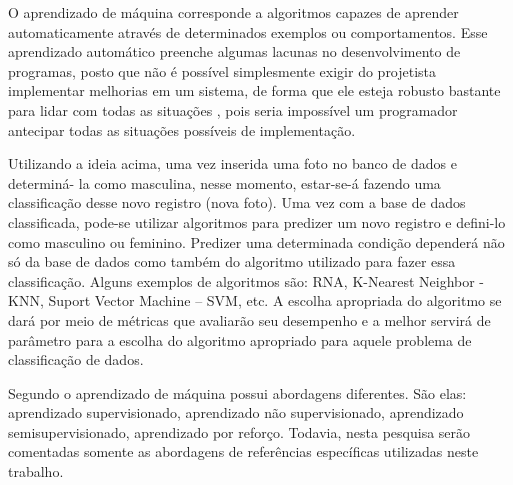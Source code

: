O aprendizado de máquina corresponde a algoritmos capazes de aprender automaticamente através de determinados exemplos ou comportamentos. Esse aprendizado automático preenche algumas lacunas no desenvolvimento de programas, posto que não é possível simplesmente exigir do projetista implementar melhorias em um sistema, de forma que ele esteja robusto bastante para lidar com todas as situações \cite{RusselStuart.Norvig2013}, pois seria impossível um programador antecipar todas as situações possíveis de implementação.



Utilizando a ideia acima, uma vez inserida uma foto no banco de dados e determiná- la como masculina, nesse momento, estar-se-á fazendo uma classificação desse novo registro (nova foto). Uma vez com a base de dados classificada, pode-se utilizar algoritmos para predizer um novo registro e defini-lo como masculino ou feminino. Predizer uma determinada condição dependerá não só da base de dados como também do algoritmo utilizado para fazer essa classificação. Alguns exemplos de algoritmos são: RNA, K-Nearest Neighbor - KNN, Suport Vector Machine – SVM, etc. A escolha apropriada do algoritmo se dará por meio de métricas que avaliarão seu desempenho e a melhor servirá de parâmetro para a escolha do algoritmo apropriado para aquele problema de classificação de dados. 


Segundo \cite{Mohri2012} o aprendizado de máquina possui abordagens diferentes. São elas: aprendizado supervisionado, aprendizado não supervisionado, aprendizado semisupervisionado, aprendizado por reforço. Todavia, nesta pesquisa serão comentadas somente as abordagens de referências específicas utilizadas neste trabalho. 

